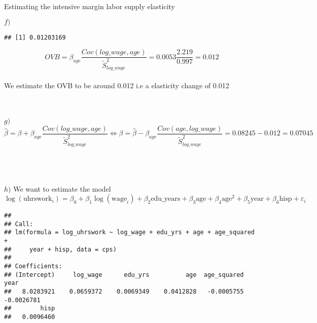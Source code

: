 \documentclass[
  ignorenonframetext,
]{beamer}
\newenvironment{Shaded}{\begin{snugshade}}{\end{snugshade}}
\newcommand{\DataTypeTok}[1]{\textcolor[rgb]{0.13,0.29,0.53}{#1}}
\newcommand{\DecValTok}[1]{\textcolor[rgb]{0.00,0.00,0.81}{#1}}
\newcommand{\KeywordTok}[1]{\textcolor[rgb]{0.13,0.29,0.53}{\textbf{#1}}}
\newcommand{\NormalTok}[1]{#1}
\newcommand{\OperatorTok}[1]{\textcolor[rgb]{0.81,0.36,0.00}{\textbf{#1}}}
\newcommand{\StringTok}[1]{\textcolor[rgb]{0.31,0.60,0.02}{#1}}
\begin{document}
\begin{frame}[fragile]{Estimating the intensive margin labor supply
elasticity}
\begin{block}{\(f)\)}
\begin{verbatim}
## [1] 0.01203169
\end{verbatim}

\hfill\break
\[OVB = \beta_{age} \frac{Cov(log\_wage,age)}{\tilde{S}^2_{log\_wage}} = 0.0053 \frac{2.219}{0.997} = 0.012\]\\
We estimate the OVB to be around 0.012 i.e a elasticity change of
0.012\\
~\\
~\\
\end{block}

\begin{block}{\(g)\)}
\protect\hypertarget{g}{}
\hfill\break
\[\hat{\beta} = \beta + \beta_{age} \frac{Cov(log\_wage,age)}{\tilde{S}^2_{log\_wage}} \Leftrightarrow \beta = \hat{\beta} -  \beta_{age} \frac{Cov(age,log\_wage)}{\tilde{S}^2_{log\_wage}} = 0.08245 - 0.012 = 0.07045\]\\
~\\
~\\
\end{block}

\begin{block}{\(h)\)}
\protect\hypertarget{h}{}
\hfill\break
We want to estimate the model\\
\[\log(\textrm{uhrswork}_i) = \beta_0 + \beta_1 \log(\textrm{wage}_i) +\beta_2\textrm{edu_years} + \beta_3\textrm{age} + \beta_4 \textrm{age}^2 + \beta_5 \textrm{year} + \beta_6 \textrm{hisp} + \varepsilon_i\]

\begin{Shaded}
\end{Shaded}

\begin{verbatim}
## 
## Call:
## lm(formula = log_uhrswork ~ log_wage + edu_yrs + age + age_squared + 
##     year + hisp, data = cps)
## 
## Coefficients:
## (Intercept)     log_wage      edu_yrs          age  age_squared         year  
##   8.0283921    0.0659372    0.0069349    0.0412828   -0.0005755   -0.0026781  
##        hisp  
##   0.0096460
\end{verbatim}


\end{block}
\end{frame}
\end{document}
